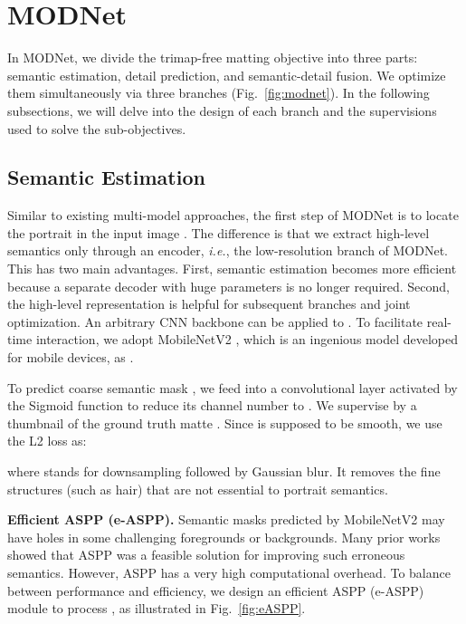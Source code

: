 \documentclass[letterpaper]{article} \usepackage{aaai22}  \usepackage{times}  \usepackage{helvet}  \usepackage{courier}  \usepackage[hyphens]{url}  \usepackage{graphicx} \urlstyle{rm} \def\UrlFont{\rm}  \usepackage{natbib}  \usepackage{caption} \usepackage{booktabs}
\begin{document}
\section{MODNet}\label{sec:3}
In MODNet, we divide the trimap-free matting objective into three parts: semantic estimation, detail prediction, and semantic-detail fusion. We optimize them simultaneously via three branches (Fig.~\ref{fig:modnet}). 
In the following subsections, we will delve into the design of each branch and the supervisions used to solve the sub-objectives.

\subsection{Semantic Estimation}\label{sec:3_2}
Similar to existing multi-model approaches, the first step of MODNet is to locate the portrait in the input image . The difference is that we extract high-level semantics only through an encoder, {\it i.e.}, the low-resolution branch  of MODNet. This has two main advantages. First, semantic estimation becomes more efficient because a separate decoder with huge parameters is no longer required. Second, the high-level representation  is helpful for subsequent branches and joint optimization. 
An arbitrary CNN backbone can be applied to .
To facilitate real-time interaction, we adopt MobileNetV2 \cite{net_mobilenetv2}, which is an ingenious model developed for mobile devices, as .

To predict coarse semantic mask , we feed  into a convolutional layer activated by the Sigmoid function to reduce its channel number to . We supervise  by a thumbnail of the ground truth matte . Since  is supposed to be smooth, we use the L2 loss as:  

where  stands for  downsampling followed by Gaussian blur. It removes the fine structures (such as hair) that are not essential to portrait semantics. 





\noindent\textbf{Efficient ASPP (e-ASPP).}
Semantic masks predicted by MobileNetV2 may have holes in some challenging foregrounds or backgrounds. Many prior works showed that ASPP was a feasible solution for improving such erroneous semantics. However, ASPP has a very high computational overhead. To balance between performance and efficiency, we design an efficient ASPP (e-ASPP) module to process , as illustrated in Fig.~\ref{fig:eASPP}.
\end{document}
